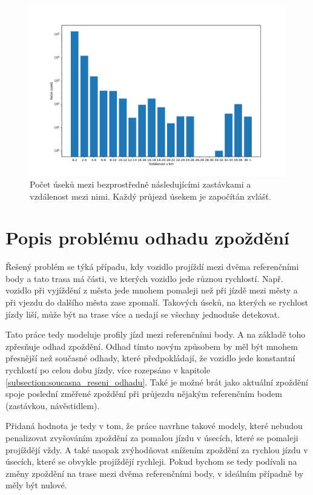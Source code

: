 \begin{figure}
	\centering
  \includegraphics[width=\linewidth]{../img/stop_distances_result}
  \caption{Počet úseků mezi bezprostředně následujícími zastávkami a vzdálenost mezi nimi. Každý průjezd úsekem je započítán zvlášť.}
  \label{fig:stop_distances_result}
\end{figure}

\section{Popis problému odhadu zpoždění}

Řešený problém se týká případu, kdy vozidlo projíždí mezi dvěma referenčními body a tato trasa má části, ve kterých vozidlo jede různou rychlostí. Např. vozidlo při vyjíždění z města jede mnohem pomaleji než při jízdě mezi městy a při vjezdu do dalšího města zase zpomalí. Takových úseků, na kterých se rychlost jízdy liší, může být na trase více a nedají se všechny jednoduše detekovat.

\bigbreak

Tato práce tedy modeluje profily jízd mezi referenčními body. A na základě toho zpřesňuje odhad zpoždění. Odhad tímto novým způsobem by měl být mnohem přesnější než současné odhady, které předpokládají, že vozidlo jede konstantní rychlostí po celou dobu jízdy, více rozepsáno v kapitole \ref{subsection:soucasna_reseni_odhadu}. Také je možné brát jako aktuální zpoždění spoje poslední změřené zpoždění při průjezdu nějakým referenčním bodem (zastávkou, návěstidlem).

\bigbreak

Přidaná hodnota je tedy v tom, že práce navrhne takové modely, které nebudou penalizovat zvyšováním zpoždění za pomalou jízdu v úsecích, které se pomaleji projíždějí vždy. A také naopak zvýhodňovat snížením zpoždění za rychlou jízdu v úsecích, které se obvykle projíždějí rychleji. Pokud bychom se tedy podívali na změny zpoždění na trase mezi dvěma referenčními body, v ideálním případně by měly být nulové.

